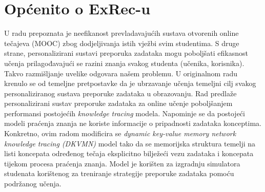 
\chapter{Općenito o ExRec-u}
U radu \citep{exrec} prepoznata je neefikanost prevladavajućih sustava otvorenih online tečajeva (MOOC) zbog dodjeljivanja istih vježbi svim studentima. S druge strane, personalizirani sustavi preporuka zadataka mogu poboljšati efikasnost učenja prilagođavajući se razini znanja svakog studenta (učenika, korisnika). Takvo razmišljanje uvelike odgovara našem problemu. U originalnom radu krenulo se od temeljne pretpostavke da je ubrzavanje učenja temeljni cilj svakog personaliziranog sustava preporuke zadataka u obrazovanju. Rad predlaže personalizirani sustav preporuke zadataka za online učenje poboljšanjem performansi postojećih \textit{knowledge tracing} modela. Napominje se da postojeći modeli praćenja znanja ne koriste informacije o pripadnosti zadataka konceptima. Konkretno, ovim radom modificira se \textit{dynamic key-value memory network knowledge tracing (DKVMN)} model tako da se memorijska struktura temelji na listi koncepata određenog tečaja eksplicitno bilježeći vezu zadataka i koncepata tijekom procesa praćenja znanja. Model je korišten za izgradnju simulatora studenata korištenog za treniranje strategije preporuke zadataka pomoću podržanog učenja. \newline
\newline
